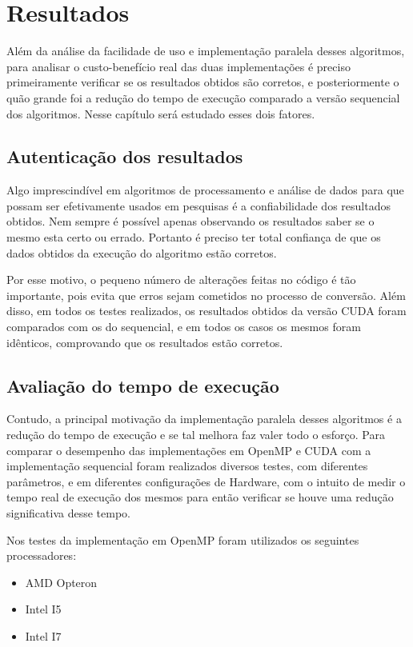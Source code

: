 \chapter{Resultados}

Além da análise da facilidade de uso e implementação paralela desses algoritmos, para analisar o custo-benefício real das duas implementações é preciso primeiramente verificar se os resultados obtidos são corretos, e posteriormente o quão grande foi a redução do tempo de execução comparado a versão sequencial dos algoritmos. Nesse capítulo será estudado esses dois fatores.

\section{Autenticação dos resultados}

Algo imprescindível em algoritmos de processamento e análise de dados para que possam ser efetivamente usados em pesquisas é a confiabilidade dos resultados obtidos. Nem sempre é possível apenas observando os resultados saber se o mesmo esta certo ou errado. Portanto é preciso ter total confiança de que os dados obtidos da execução do algoritmo estão corretos.

Por esse motivo, o pequeno número de alterações feitas no código é tão importante, pois evita que erros sejam cometidos no processo de conversão. Além disso, em todos os testes realizados, os resultados obtidos da versão CUDA foram comparados com os do sequencial, e em todos os casos os mesmos foram idênticos, comprovando que os resultados estão corretos.

\section{Avaliação do tempo de execução}

Contudo, a principal motivação da implementação paralela desses algoritmos é a redução do tempo de execução e se tal melhora faz valer todo o esforço. Para comparar o desempenho das implementações em OpenMP e CUDA com a implementação sequencial foram realizados diversos testes, com diferentes parâmetros, e em diferentes configurações de Hardware, com o intuito de medir o tempo real de execução dos mesmos para então verificar se houve uma redução significativa desse tempo.

Nos testes da implementação em OpenMP foram utilizados os seguintes processadores:

\begin{itemize}
\item AMD Opteron
\item Intel I5
\item Intel I7
\end{itemize}

